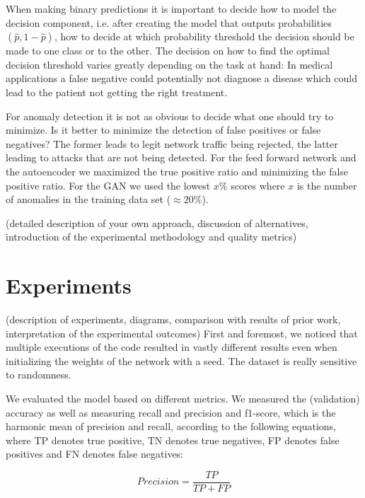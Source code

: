 \documentclass[]{article}
\begin{document}
     When making binary predictions it is important to decide how to model the decision component, i.e. after creating the model that outputs probabilities $(\hat{p}, 1-\hat{p})$, how to decide at which probability threshold the decision should be made to one class or to the other. The decision on how to find the optimal decision threshold varies greatly depending on the task at hand: In medical applications a false negative could potentially not diagnose a disease which could lead to the patient not getting the right treatment.
     
     For anomaly detection it is not as obvious to decide what one should try to minimize. Is it better to minimize the detection of false positives or false negatives? The former leads to legit network traffic being rejected, the latter leading to attacks that are not being detected. For the feed forward network and the autoencoder we maximized the true positive ratio and minimizing the false positive ratio. For the GAN we used the lowest $x\%$ scores where $x$ is the number of anomalies in the training data set ($\approx20$\%).
     
     
	(detailed description of your own approach, discussion of alternatives, introduction of the experimental methodology and quality metrics)
	
	
	\section{Experiments}
	(description of experiments, diagrams, comparison with results of prior work, interpretation of the experimental outcomes)
	First and foremost, we noticed that multiple executions of the code resulted in vastly different results even when initializing the weights of the network with a seed. The dataset is really sensitive to randomness.
	
	We evaluated the model based on different metrics. We measured the (validation) accuracy as well as measuring recall and precision and f1-score, which is the harmonic mean of precision and recall, according to the following equations, where TP denotes true positive, TN denotes true negatives, FP denotes false positives and FN denotes false negatives: 
	
	\begin{equation}
		Precision = \frac{TP}{TP + FP}
	\end{equation}
	
\end{document}
